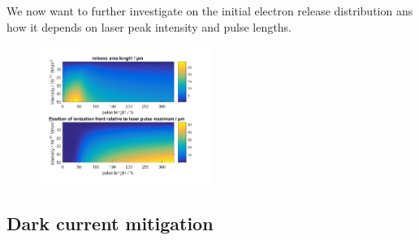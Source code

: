 We now want to further investigate on the initial electron release distribution ans how it depends on laser peak intensity and pulse lengths.


\begin{figure}[h]
\begin{center}
\includegraphics[width=0.5\textwidth]{theory/images/edited/IonFrontVariation.pdf}
\end{center}
\end{figure}

\subsection{Dark current mitigation}
